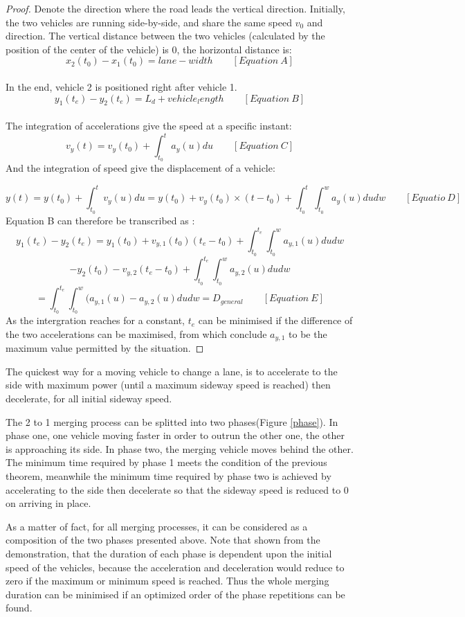 \documentclass{mcmthesis}
\newcommand{\reffig}[1]{Figure \ref{#1}}
\begin{document}
\begin{proof}
Denote the direction where the road leads the vertical direction.
Initially, the two vehicles are running side-by-side, and share the same speed $v_0$ and direction.
The vertical distance between the two vehicles (calculated by the position of the center of the vehicle) is 0, the horizontal distance is: $$x_2(t_0)-x_1(t_0)=lane-width \qquad [Equation\ A]$$\\
In the end, vehicle 2 is positioned right after vehicle 1.
$$y_1(t_e)-y_2(t_e)=L_d+vehicle_length \qquad [Equation\ B]$$\\
The integration of accelerations give the speed at a specific instant:
 $$v_y(t)=v_y(t_0)+ \int_{t_0}^{t}a_y(u)du \qquad [Equation\ C]$$
And the integration of speed give the displacement of a vehicle:

$$y(t)=y(t_0)+ \int_{t_0}^{t}v_y(u)du=y(t_0)+v_y(t_0) \times (t-t_0)+ \int_{t_0}^{t}\int_{t_0}^{w}a_y(u)dudw \qquad [Equatio\ D]$$
Equation B can therefore be transcribed as :
$$y_1(t_e)-y_2(t_e)=y_1(t_0)+v_{y,1}(t_0)(t_e-t_0)+\int_{t_0}^{t_e}\int_{t_0}^{w}a_{y,1}(u)dudw$$
$$-y_2(t_0)-v_{y,2}(t_e-t_0)+\int_{t_0}^{t_e}\int_{t_0}^{w}a_{y,2}(u)dudw$$
$$ =\int_{t_0}^{t_e}\int_{t_0}^{w}(a_{y,1}(u)-a_{y,2}(u)dudw=D_{general}\qquad [Equation\ E]$$
As the intergration reaches for a constant, $t_e$ can be minimised if the difference of the two accelerations can be maximised, from which conclude $a_{y,1}$ to be the maximum value permitted by the situation.

\end{proof}

\begin{Theorem} \label{thm:yingsongsheng3}
The quickest way for a moving vehicle to change a lane, is to accelerate to the side with maximum power (until a maximum sideway speed is reached) then decelerate, for all initial sideway speed.
\end{Theorem}

The 2 to 1 merging process can be splitted into two phases(\reffig{phase}). In phase one, one vehicle moving faster in order to outrun the other one, the other is approaching its side. In phase two, the merging vehicle moves behind the other. The minimum time required by phase 1 meets the condition of the previous theorem, meanwhile the minimum time required by phase two is achieved by accelerating to the side then decelerate so that the sideway speed is reduced to 0 on arriving in place.


As a matter of fact, for all merging processes, it can be considered as a composition of the two phases presented above. Note that shown from the demonstration, that the duration of each phase is dependent upon the initial speed of the vehicles, because the acceleration and deceleration would reduce to zero if the maximum or minimum speed is reached. Thus the whole merging duration can be minimised if an optimized order of the phase repetitions can be found.
\end{document}
